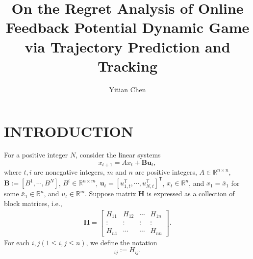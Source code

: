 \documentclass{article}
\title{On the Regret Analysis of Online Feedback Potential Dynamic Game via Trajectory Prediction and Tracking}
\author{Yitian Chen}
\newcommand{\transpose}{\mathsf{T}}
\begin{document}
\maketitle

\section{INTRODUCTION}
For a positive integer $N$, consider the linear systems
\begin{equation}\label{eq:linsys}
    x_{t+1} = Ax_{t} + \mathbf{B}\mathbf{u}_{t},
\end{equation}
where $t,i$ are nonegative integers, $m$ and $n$ are positive integers, $A \in \mathbb{R}^{n\times n}$, $\mathbf{B} := [B^{1},\cdots, B^{N}]$, $B^{i} \in \mathbb{R}^{n\times m}$, $\mathbf{u}_{t} = [u_{1,t}^{\transpose},\cdots,u_{N,t}^{\transpose}]^{\transpose}$, $x_t\in\mathbb{R}^n$, and $x_{1} =\bar{x}_{1}$ for some $\bar{x}_1 \in \mathbb{R}^{n}$, and $u_{t} \in \mathbb{R}^{m}$. Suppose matrix $\mathbf{H}$ is expressed as a collection of block matrices, i.e.,
\begin{align*}
    \mathbf{H} = 
    \begin{bmatrix}
        H_{11} & H_{12} & \cdots & H_{1n}\\
        \vdots & \vdots & \vdots & \vdots\\
        H_{n1} & \cdots & \cdots & H_{nn}
    \end{bmatrix}.
\end{align*}
For each $i,j(1\leq i,j\leq n)$, we define the notation
\begin{equation}
    [\mathbf{H}]_{ij} := H_{ij}.
\end{equation}
\end{document}
